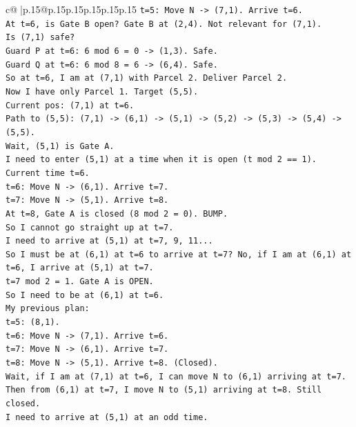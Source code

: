 \documentclass{article}
\begin{document}
{\begin{supertabular}{c@{$\;$}|p{.15\linewidth}@{}p{.15\linewidth}p{.15\linewidth}p{.15\linewidth}p{.15\linewidth}p{.15\linewidth}}
{{{\texttt{t=5: Move N {-}> (7,1). Arrive t=6.} \\
\texttt{At t=6, is Gate B open? Gate B at (2,4). Not relevant for (7,1).} \\
\texttt{Is (7,1) safe?} \\
\texttt{Guard P at t=6: 6 mod 6 = 0 {-}> (1,3). Safe.} \\
\texttt{Guard Q at t=6: 6 mod 8 = 6 {-}> (6,4). Safe.} \\
\texttt{So at t=6, I am at (7,1) with Parcel 2. Deliver Parcel 2.} \\
\texttt{Now I have only Parcel 1. Target (5,5).} \\
\texttt{Current pos: (7,1) at t=6.} \\
\texttt{Path to (5,5): (7,1) {-}> (6,1) {-}> (5,1) {-}> (5,2) {-}> (5,3) {-}> (5,4) {-}> (5,5).} \\
\texttt{Wait, (5,1) is Gate A.} \\
\texttt{I need to enter (5,1) at a time when it is open (t mod 2 == 1).} \\
\texttt{Current time t=6.} \\
\texttt{t=6: Move N {-}> (6,1). Arrive t=7.} \\
\texttt{t=7: Move N {-}> (5,1). Arrive t=8.} \\
\texttt{At t=8, Gate A is closed (8 mod 2 = 0). BUMP.} \\
\texttt{So I cannot go straight up at t=7.} \\
\texttt{I need to arrive at (5,1) at t=7, 9, 11...} \\
\texttt{So I must be at (6,1) at t=6 to arrive at t=7? No, if I am at (6,1) at t=6, I arrive at (5,1) at t=7.} \\
\texttt{t=7 mod 2 = 1. Gate A is OPEN.} \\
\texttt{So I need to be at (6,1) at t=6.} \\
\texttt{My previous plan:} \\
\texttt{t=5: (8,1).} \\
\texttt{t=6: Move N {-}> (7,1). Arrive t=6.} \\
\texttt{t=7: Move N {-}> (6,1). Arrive t=7.} \\
\texttt{t=8: Move N {-}> (5,1). Arrive t=8. (Closed).} \\
\texttt{Wait, if I am at (7,1) at t=6, I can move N to (6,1) arriving at t=7.} \\
\texttt{Then from (6,1) at t=7, I move N to (5,1) arriving at t=8. Still closed.} \\
\texttt{I need to arrive at (5,1) at an odd time.} \\
}}}
\end{supertabular}}
\end{document}

